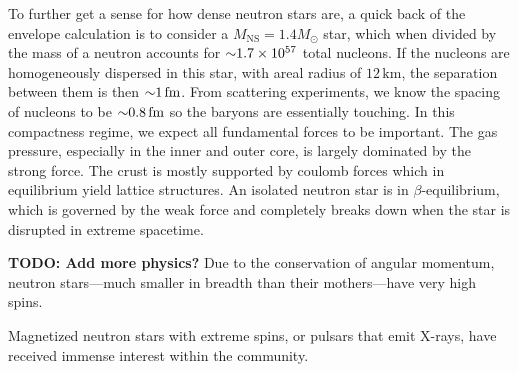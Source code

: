 To further get a sense for how dense neutron stars are, a quick back of the envelope calculation is to consider a $M_\textrm{NS} = 1.4 M _\odot$ star, which when divided by the mass of a neutron accounts for $\mathord{\sim} 1.7 \times 10^{57}$ total nucleons.
If the nucleons are homogeneously dispersed in this star, with areal radius of $12\,\textrm{km}$, the separation between them is then $\mathord{\sim} 1\,\textrm{fm}$.
From scattering experiments, we know the spacing of nucleons to be $\mathord{\sim} 0.8\,\textrm{fm}$ so the baryons are essentially touching.
In this compactness regime, we expect all fundamental forces to be important.
The gas pressure, especially in the inner and outer core, is largely dominated by the strong force.  
The crust is mostly supported by coulomb forces which in equilibrium yield lattice structures.
An isolated neutron star is in $\beta$-equilibrium, which is governed by the weak force and completely breaks down when the star is disrupted in extreme spacetime.


\textbf{TODO: Add more physics?}
Due to the conservation of angular momentum, neutron stars---much smaller in breadth than their mothers---have very high spins.

Magnetized neutron stars with extreme spins, or pulsars that emit X-rays,
 have received immense interest within the community.


%
%

